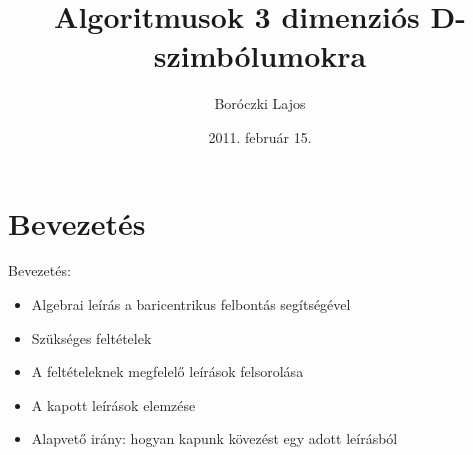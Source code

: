\usepackage[magyar]{babel}
\usepackage[T1]{fontenc}
\usepackage[utf8]{inputenc}
\usepackage{graphicx}
\usepackage{listings}
\usepackage{amsmath}
\usepackage{amssymb}
\usepackage{ae,aecompl}


\newtheorem{thm}{Tétel}[section]
\newtheorem{thmsub}{Tétel}[subsection]
\newtheorem{lem}[thm]{Lemma}
\newtheorem{lemsub}[thmsub]{Lemma}
\newtheorem{all}[thm]{Állítás}
\newtheorem{allsub}[thmsub]{Állítás}
\newtheorem{kov}[thm]{Következmény}
\newtheorem{sej}[thm]{Sejtés}

\newtheorem{defn}[thm]{Definíció}
\newtheorem{defnsub}[thmsub]{Definíció}
\newtheorem{jel}[thm]{Jelölés}

\newtheorem{alg}[thm]{Algoritmus}
\newtheorem{megj}[thm]{Megjegyzés}
\newenvironment{biz}{Bizonyítás: }{$\square$}
\newcommand{\leftexp}[2]{{\vphantom{#2}}^{#1}{#2}}

\title{Algoritmusok 3 dimenziós D-szimbólumokra}
\author{Boróczki Lajos}
\date{2011. február 15.}



\begin{frame}
  \maketitle
\end{frame}

\begin{frame}
  \tableofcontents
\end{frame}
\newpage

\section{Bevezetés}
\begin{frame}
  Bevezetés:
  \begin{itemize}
    \item Algebrai leírás a baricentrikus felbontás segítségével
    \item Szükséges feltételek
    \item A feltételeknek megfelelő leírások felsorolása
    \item A kapott leírások elemzése
    \item Alapvető irány: hogyan kapunk kövezést egy adott leírásból
  \end{itemize}
\end{frame}


